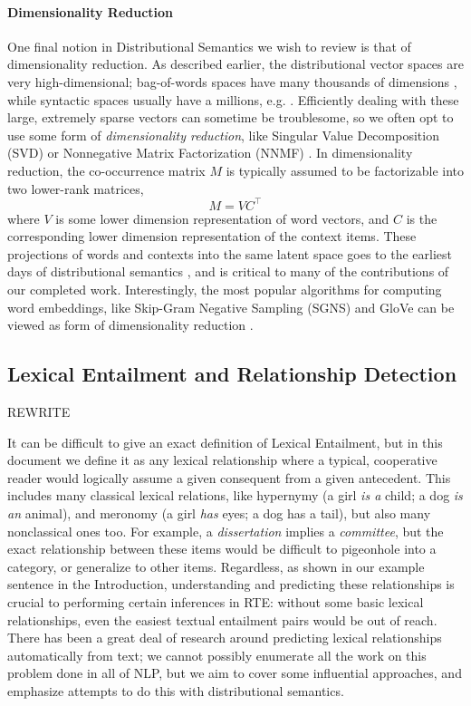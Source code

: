 \documentclass[12pt]{article}
\begin{document}
\paragraph{Dimensionality Reduction}
One final notion in Distributional Semantics we wish to review is that of
dimensionality reduction. As described earlier, the distributional vector
spaces are very high-dimensional; bag-of-words spaces have many thousands of
dimensions \cite{turney:2010:jair,mikolov:2013:iclr,pennington:2014:emnlp},
while syntactic spaces usually have a millions, e.g. .
Efficiently dealing with these large, extremely sparse vectors can sometime be
troublesome, so we often opt to use some form of {\em dimensionality
reduction}, like Singular Value Decomposition (SVD)
\cite{deerwester:1990:jsis,landauer:1997:pr} or Nonnegative Matrix
Factorization (NNMF) \cite{lee:2000:nips}. In dimensionality reduction, the
co-occurrence matrix $M$ is typically assumed to be factorizable into two
lower-rank matrices,
\begin{equation}
  M = VC^{\top}
  \label{eqn:svd}
\end{equation}
where $V$ is some lower dimension representation of word vectors, and $C$ is
the corresponding lower dimension representation of the context items. These
projections of words and contexts into the same latent space goes to the
earliest days of distributional semantics \cite{deerwester:1990:jsis}, and is
critical to many of the contributions of our completed work.  Interestingly,
the most popular algorithms for computing word embeddings, like Skip-Gram
Negative Sampling (SGNS) \cite{mikolov:2013:iclr} and GloVe
\cite{pennington:2014:emnlp} can be viewed as form of dimensionality reduction
\cite{levy:2014:nips,levy:2015:tacl}.

\subsection{Lexical Entailment and Relationship Detection}

REWRITE

It can be difficult to give an exact definition of Lexical Entailment, but in
this document we define it as any lexical relationship where a typical,
cooperative reader would logically assume a given consequent from a given
antecedent. This includes many classical lexical relations, like hypernymy (a
girl {\em is a} child; a dog {\em is an} animal), and meronomy (a girl {\em
has} eyes; a dog {has a} tail), but also many nonclassical ones too. For
example, a {\em dissertation} implies a {\em committee}, but the exact
relationship between these items would be difficult to pigeonhole into a
category, or generalize to other items. Regardless, as shown in our example
sentence in the Introduction, understanding and predicting these relationships
is crucial to performing certain inferences in RTE: without some basic lexical
relationships, even the easiest textual entailment pairs would be out of
reach. There has been a great deal of research around predicting lexical
relationships automatically from text; we cannot possibly enumerate all the
work on this problem done in all of NLP, but we aim to cover some influential
approaches, and emphasize attempts to do this with distributional semantics.
\end{document}
